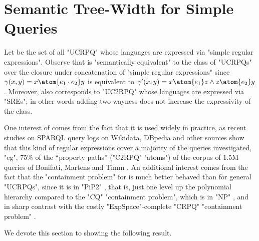 \section{\AP{}Semantic Tree-Width for Simple Queries}
\label{sec:sre}

\AP Let \intro*{\UCRPQSRE} be the set of all "UCRPQ" whose languages are expressed via "simple regular expressions". Observe that {\UCRPQSRE} is "semantically equivalent" to the class of "UCRPQs" over the closure under concatenation of "simple regular expressions"
since $\gamma(x,y) = x \atom{e_1 \cdot e_2} y$ is equivalent to $\gamma'(x,y) = x \atom{e_1} z \land  z \atom{e_2} y$.
Moreover, \UCRPQSRE{} also corresponds to "UC2RPQ" whose languages are expressed via "SREs";
in other words adding two-wayness does not increase the expressivity of the class. 
%

One interest of {\UCRPQSRE} comes from the fact that it is used widely in practice, as recent studies on SPARQL query logs on Wikidata, DBpedia and other sources show that this kind of regular expressions cover a majority of the queries investigated, "eg", 75\% of
the ``property paths'' ("C2RPQ" "atoms") of the corpus of 1.5M queries of Bonifati, Martens and Timm \cite[Table 15]{BonifatiMartensTimm2020SPARQL}.
An additional interest comes from the fact that the "containment problem" for {\UCRPQSRE} is much better behaved than for general "UCRPQs", since it is in {"PiP2"} \cite[Corollary 5.2]{FigueiraEtal2020Containment}, that is, just one level up the polynomial hierarchy compared to the "CQ" "containment problem", which is in "NP" \cite{ChandraMerlin1977Implementation}, and in sharp contrast with the costly "ExpSpace"-complete "CRPQ" "containment problem" \cite{CalvaneseDeGiacomoLenzeriniVardi2000Containment,FlorescuLevySuciu1998Containment}.

We devote this section to showing the following result.

\thmSemTwSREpitwo 

